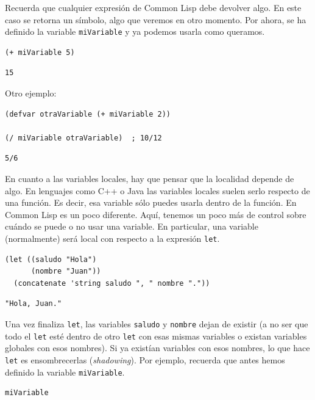 \documentclass[11pt]{article}
\begin{document}
Recuerda que cualquier expresión de Common Lisp debe devolver algo. En este caso se retorna un símbolo, algo que veremos en otro momento. Por ahora, se ha definido la variable \texttt{miVariable} y ya podemos usarla como queramos. 

\begin{verbatim}
(+ miVariable 5)
\end{verbatim}

\begin{verbatim}
15
\end{verbatim}


Otro ejemplo:

\begin{verbatim}
(defvar otraVariable (+ miVariable 2))

(/ miVariable otraVariable)  ; 10/12
\end{verbatim}

\begin{verbatim}
5/6
\end{verbatim}


En cuanto a las variables locales, hay que pensar que la localidad depende de algo. En lenguajes como C++ o Java las variables locales suelen serlo respecto de una función. Es decir, esa variable sólo puedes usarla dentro de la función. En Common Lisp es un poco diferente. Aquí, tenemos un poco más de control sobre cuándo se puede o no usar una variable. En particular, una variable (normalmente) será local con respecto a la expresión \texttt{let}. 

\begin{verbatim}
(let ((saludo "Hola")
      (nombre "Juan"))
  (concatenate 'string saludo ", " nombre "."))
\end{verbatim}

\begin{verbatim}
"Hola, Juan."
\end{verbatim}


Una vez finaliza \texttt{let}, las variables \texttt{saludo} y \texttt{nombre} dejan de existir (a no ser que todo el \texttt{let} esté dentro de otro \texttt{let} con esas mismas variables o existan variables globales con esos nombres). Si ya existían variables con esos nombres, lo que hace \texttt{let} es ensombrecerlas (\emph{shadowing}). Por ejemplo, recuerda que antes hemos definido la variable \texttt{miVariable}.

\begin{verbatim}
miVariable
\end{verbatim}
\end{document}

